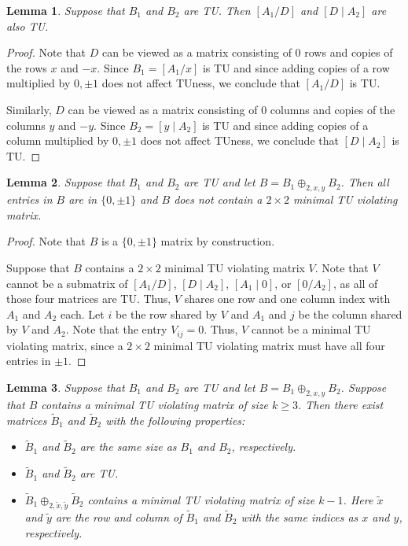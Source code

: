 \documentclass{article}
\newtheorem{lemma}{Lemma}
\theoremstyle{definition}
\begin{document}
\begin{lemma}
    Suppose that $B_{1}$ and $B_{2}$ are TU. Then $\left[A_{1} / D\right]$ and $\left[D \mid A_{2}\right]$ are also TU.
\end{lemma}

\begin{proof}
    Note that $D$ can be viewed as a matrix consisting of $0$ rows and copies of the rows $x$ and $-x$. Since $B_{1} = \left[A_{1} / x\right]$ is TU and since adding copies of a row multiplied by ${0, \pm 1}$ does not affect TUness, we conclude that $\left[A_{1} / D\right]$ is TU.

    Similarly, $D$ can be viewed as a matrix consisting of $0$ columns and copies of the columns $y$ and $-y$. Since $B_{2} = \left[y \mid A_{2}\right]$ is TU and since adding copies of a column multiplied by ${0, \pm 1}$ does not affect TUness, we conclude that $\left[D \mid A_{2}\right]$ is TU.
\end{proof}

\begin{lemma}\label{lem:two_sum_reg_mvm_12}
    Suppose that $B_{1}$ and $B_{2}$ are TU and let $B = B_{1} \oplus_{2, x, y} B_{2}$. Then all entries in $B$ are in $\{0, \pm 1\}$ and $B$ does not contain a $2 \times 2$ minimal TU violating matrix.
\end{lemma}

\begin{proof}
    Note that $B$ is a $\{0, \pm 1\}$ matrix by construction.

    Suppose that $B$ contains a $2 \times 2$ minimal TU violating matrix $V$. Note that $V$ cannot be a submatrix of $\left[A_{1} / D\right]$, $\left[D \mid A_{2}\right]$, $\left[A_{1} \mid 0\right]$, or $\left[0 / A_{2}\right]$, as all of those four matrices are TU. Thus, $V$ shares one row and one column index with $A_{1}$ and $A_{2}$ each. Let $i$ be the row shared by $V$ and $A_{1}$ and $j$ be the column shared by $V$ and $A_{2}$. Note that the entry $V_{ij} = 0$. Thus, $V$ cannot be a minimal TU violating matrix, since a $2 \times 2$ minimal TU violating matrix must have all four entries in $\pm 1$.
\end{proof}

\begin{lemma}\label{lem:two_sum_reg_mvm_induction}
    Suppose that $B_{1}$ and $B_{2}$ are TU and let $B = B_{1} \oplus_{2, x, y} B_{2}$. Suppose that $B$ contains a minimal TU violating matrix of size $k \geq 3$. Then there exist matrices $\tilde{B}_{1}$ and $\tilde{B}_{2}$ with the following properties:
    \begin{itemize}
        \item $\tilde{B}_{1}$ and $\tilde{B}_{2}$ are the same size as $B_{1}$ and $B_{2}$, respectively.
        \item $\tilde{B}_{1}$ and $\tilde{B}_{2}$ are TU.
        \item $\tilde{B}_{1} \oplus_{2, \tilde{x}, \tilde{y}} \tilde{B}_{2}$ contains a minimal TU violating matrix of size $k - 1$. Here $\tilde{x}$ and $\tilde{y}$ are the row and column of $\tilde{B}_{1}$ and $\tilde{B}_{2}$ with the same indices as $x$ and $y$, respectively.
    \end{itemize}
\end{lemma}
\end{document}
